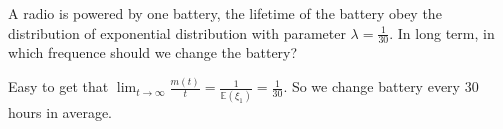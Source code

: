 \documentclass{ctexart}
\newif\ifpreface
\begin{document}
\large
\setlength{\baselineskip}{1.2em}
\ifpreface
  
\else
\fi
{}
\begin{problem}\label{pro:1}
  A radio is powered by one battery,
  the lifetime of the battery obey the distribution of exponential distribution
  with parameter \(\lambda = \frac{1}{30}\). In long term, in which frequence should we change the battery?
\end{problem}
\begin{solution}
  Easy to get that \(\lim_{t \to \infty}\frac{m(t)}{t}=\frac{1}{\mathbb{E}(\xi_1)}=\frac{1}{30}\).
  So we change battery every \(30\) hours in average.
\end{solution}
\end{document}
